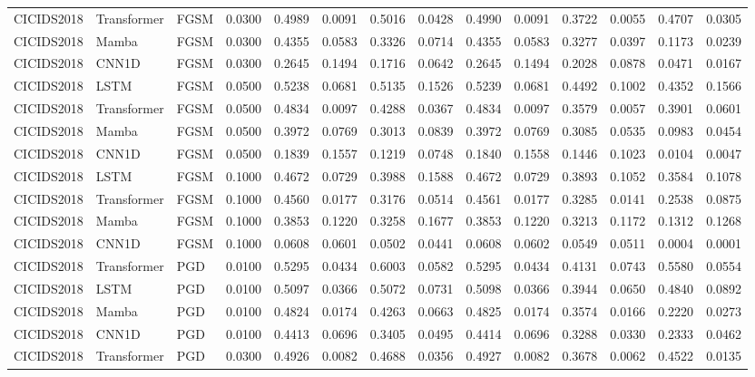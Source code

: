 \begin{table}[ht]
\begin{tabular}{lllrrrrrrrrrrr}
CICIDS2018 & Transformer & FGSM & 0.0300 & 0.4989 & 0.0091 & 0.5016 & 0.0428 & 0.4990 & 0.0091 & 0.3722 & 0.0055 & 0.4707 & 0.0305 \\
CICIDS2018 & Mamba & FGSM & 0.0300 & 0.4355 & 0.0583 & 0.3326 & 0.0714 & 0.4355 & 0.0583 & 0.3277 & 0.0397 & 0.1173 & 0.0239 \\
CICIDS2018 & CNN1D & FGSM & 0.0300 & 0.2645 & 0.1494 & 0.1716 & 0.0642 & 0.2645 & 0.1494 & 0.2028 & 0.0878 & 0.0471 & 0.0167 \\
CICIDS2018 & LSTM & FGSM & 0.0500 & 0.5238 & 0.0681 & 0.5135 & 0.1526 & 0.5239 & 0.0681 & 0.4492 & 0.1002 & 0.4352 & 0.1566 \\
CICIDS2018 & Transformer & FGSM & 0.0500 & 0.4834 & 0.0097 & 0.4288 & 0.0367 & 0.4834 & 0.0097 & 0.3579 & 0.0057 & 0.3901 & 0.0601 \\
CICIDS2018 & Mamba & FGSM & 0.0500 & 0.3972 & 0.0769 & 0.3013 & 0.0839 & 0.3972 & 0.0769 & 0.3085 & 0.0535 & 0.0983 & 0.0454 \\
CICIDS2018 & CNN1D & FGSM & 0.0500 & 0.1839 & 0.1557 & 0.1219 & 0.0748 & 0.1840 & 0.1558 & 0.1446 & 0.1023 & 0.0104 & 0.0047 \\
CICIDS2018 & LSTM & FGSM & 0.1000 & 0.4672 & 0.0729 & 0.3988 & 0.1588 & 0.4672 & 0.0729 & 0.3893 & 0.1052 & 0.3584 & 0.1078 \\
CICIDS2018 & Transformer & FGSM & 0.1000 & 0.4560 & 0.0177 & 0.3176 & 0.0514 & 0.4561 & 0.0177 & 0.3285 & 0.0141 & 0.2538 & 0.0875 \\
CICIDS2018 & Mamba & FGSM & 0.1000 & 0.3853 & 0.1220 & 0.3258 & 0.1677 & 0.3853 & 0.1220 & 0.3213 & 0.1172 & 0.1312 & 0.1268 \\
CICIDS2018 & CNN1D & FGSM & 0.1000 & 0.0608 & 0.0601 & 0.0502 & 0.0441 & 0.0608 & 0.0602 & 0.0549 & 0.0511 & 0.0004 & 0.0001 \\
CICIDS2018 & Transformer & PGD & 0.0100 & 0.5295 & 0.0434 & 0.6003 & 0.0582 & 0.5295 & 0.0434 & 0.4131 & 0.0743 & 0.5580 & 0.0554 \\
CICIDS2018 & LSTM & PGD & 0.0100 & 0.5097 & 0.0366 & 0.5072 & 0.0731 & 0.5098 & 0.0366 & 0.3944 & 0.0650 & 0.4840 & 0.0892 \\
CICIDS2018 & Mamba & PGD & 0.0100 & 0.4824 & 0.0174 & 0.4263 & 0.0663 & 0.4825 & 0.0174 & 0.3574 & 0.0166 & 0.2220 & 0.0273 \\
CICIDS2018 & CNN1D & PGD & 0.0100 & 0.4413 & 0.0696 & 0.3405 & 0.0495 & 0.4414 & 0.0696 & 0.3288 & 0.0330 & 0.2333 & 0.0462 \\
CICIDS2018 & Transformer & PGD & 0.0300 & 0.4926 & 0.0082 & 0.4688 & 0.0356 & 0.4927 & 0.0082 & 0.3678 & 0.0062 & 0.4522 & 0.0135 \\

\end{tabular}
\end{table}
